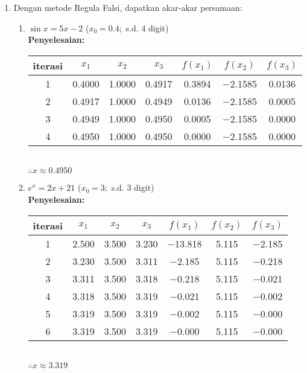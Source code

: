 \documentclass{article}
\newcommand{\penyelesaian}{\textbf{Penyelesaian: }}
\begin{document}
\begin{enumerate}
    \item Dengan metode Regula Falsi, dapatkan akar-akar persamaan:
    \begin{enumerate}
        \item $\sin x = 5x - 2$ ($x_0 = \num{0,4};$ s.d. 4 digit) \\
        \penyelesaian \\
        \begin{tabular}{|c|c|c|c|c|c|c|}
            \hline
            iterasi & $x_1$ & $x_2$ & $x_3$ & $f(x_1)$ & $f(x_2)$ & $f(x_3)$ \\
            \hline
            1 & \num{0,4000} & \num{1,0000} & \num{0,4917} & \num{0,3894} & \num{-2,1585} & \num{0,0136}\\
            2 & \num{0,4917} & \num{1,0000} & \num{0,4949} & \num{0,0136} & \num{-2,1585} & \num{0,0005}\\
            3 & \num{0,4949} & \num{1,0000} & \num{0,4950} & \num{0,0005} & \num{-2,1585} & \num{0,0000}\\
            4 & \num{0,4950} & \num{1,0000} & \num{0,4950} & \num{0,0000} & \num{-2,1585} & \num{0,0000}\\
             \hline
            \end{tabular}         \\   
        $\therefore x \approx \num{0,4950}$
    
        \item $e^x = 2x + 21$ ($x_0 = \num{3};$ s.d. 3 digit) \\
        \penyelesaian \\
        \begin{tabular}{|c|c|c|c|c|c|c|}
            \hline
            iterasi & $x_1$ & $x_2$ & $x_3$ & $f(x_1)$ & $f(x_2)$ & $f(x_3)$ \\
            \hline
            1 & \num{2,500} & \num{3,500} & \num{3,230} & \num{-13,818} & \num{5,115} & \num{-2,185}\\
            2 & \num{3,230} & \num{3,500} & \num{3,311} & \num{-2,185} & \num{5,115} & \num{-0,218}\\
            3 & \num{3,311} & \num{3,500} & \num{3,318} & \num{-0,218} & \num{5,115} & \num{-0,021}\\
            4 & \num{3,318} & \num{3,500} & \num{3,319} & \num{-0,021} & \num{5,115} & \num{-0,002}\\
            5 & \num{3,319} & \num{3,500} & \num{3,319} & \num{-0,002} & \num{5,115} & \num{-0,000}\\
            6 & \num{3,319} & \num{3,500} & \num{3,319} & \num{-0,000} & \num{5,115} & \num{-0,000}\\
             \hline
            \end{tabular}\\
        $\therefore x \approx \num{3,319}$
    

\end{enumerate}
\end{enumerate}
\end{document}
